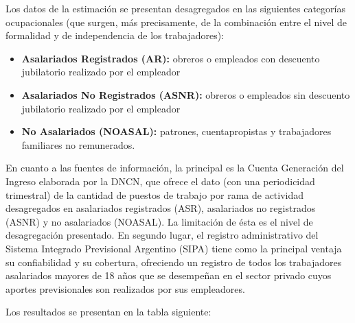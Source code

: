\documentclass[
  openany]{book}
\providecommand{\tightlist}{%
  \setlength{\itemsep}{0pt}\setlength{\parskip}{0pt}}
\begin{document}
Los datos de la estimación se presentan desagregados en las siguientes categorías ocupacionales (que surgen, más precisamente, de la combinación entre el nivel de formalidad y de independencia de los trabajadores):

\begin{itemize}
\tightlist
\item
  \textbf{Asalariados Registrados (AR):} obreros o empleados con descuento jubilatorio realizado por el empleador
\item
  \textbf{Asalariados No Registrados (ASNR):} obreros o empleados sin descuento jubilatorio realizado por el empleador
\item
  \textbf{No Asalariados (NOASAL):} patrones, cuentapropistas y trabajadores familiares no remunerados.
\end{itemize}

En cuanto a las fuentes de información, la principal es la Cuenta Generación del Ingreso elaborada por la DNCN, que ofrece el dato (con una periodicidad trimestral) de la cantidad de puestos de trabajo por rama de actividad desagregados en asalariados registrados (ASR), asalariados no registrados (ASNR) y no asalariados (NOASAL). La limitación de ésta es el nivel de desagregación presentado. En segundo lugar, el registro administrativo del Sistema Integrado Previsional Argentino (SIPA) tiene como la principal ventaja su confiabilidad y su cobertura, ofreciendo un registro de todos los trabajadores asalariados mayores de 18 años que se desempeñan en el sector privado cuyos aportes previsionales son realizados por sus empleadores.

Los resultados se presentan en la tabla siguiente:
\end{document}
